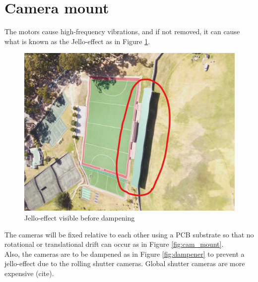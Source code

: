 \section{Camera mount}

The motors cause high-frequency vibrations, and if not removed, it can cause what is known as the Jello-effect as in Figure \ref{fig:jello_effect}.

\begin{figure}[H]
\centering
\includegraphics[scale=0.27]{images/ripple.jpg}
\caption{Jello-effect visible before dampening}
\label{fig:jello_effect}
\end{figure}

The cameras will be fixed relative to each other using a PCB substrate so that no rotational or translational drift can occur as in Figure \ref{fig:cam_mount}.\\

Also, the cameras are to be dampened as in Figure \ref{fig:dampener} to prevent a jello-effect due to the rolling shutter cameras. Global shutter cameras are more expensive (cite).

